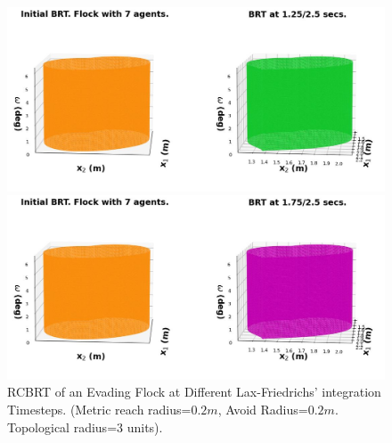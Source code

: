 \begin{figure}[tb!]
	\centering
	\begin{minipage}[b]{\textwidth}		
		\includegraphics[width=\textwidth]{figures/murmurations_1.5.jpg} 
	\end{minipage}
	\begin{minipage}[b]{\textwidth}		
		\includegraphics[width=\textwidth]{figures/murmurations_2.0.jpg} 
	\end{minipage}
	\caption{\footnotesize RCBRT of an Evading Flock at Different Lax-Friedrichs' integration Timesteps.   
		(Metric reach radius=$0.2m$, Avoid Radius=$0.2m$. Topological radius=3 units).} 
	\label{fig:flocks_rcbrt}
\end{figure}